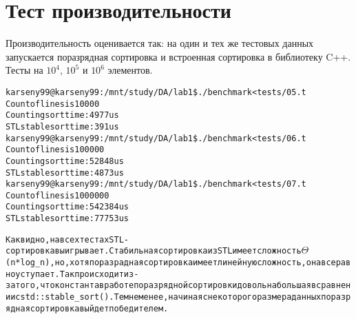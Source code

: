 \section{Тест производительности}

Производительность оценивается так: на один и тех же тестовых данных запускается поразрядная сортировка и встроенная сортировка в библиотеку C++. Тесты на $10^4$, $10^5$ и $10^6$ элементов.

\begin{alltt}
karseny99@karseny99:/mnt/study/DA/lab1\$ ./benchmark < tests/05.t
Count of lines is 10000
Counting sort time: 4977us
STL stable sort time: 391us
karseny99@karseny99:/mnt/study/DA/lab1\$ ./benchmark < tests/06.t
Count of lines is 100000
Counting sort time: 52848us
STL stable sort time: 4873us
karseny99@karseny99:/mnt/study/DA/lab1\$ ./benchmark < tests/07.t
Count of lines is 1000000
Counting sort time: 542384us
STL stable sort time: 77753us

Как видно, на всех тестах STL-сортировка выигрывает. Стабильная сортировка из STL имеет сложность \(\Theta\)(n*log_n), но, хотя поразрадная сортировка имеет линейную сложность, она все равно уступает. Так происходит из-за того, что константа в работе поразрядной сортировки довольна большая в сравнении с std::stable_sort(). Тем не менее, начиная с некоторого размера данных поразрядная сортировка выйдет победителем.
\end{alltt}

\pagebreak
